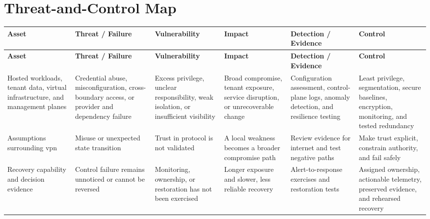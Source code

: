 \documentclass[11pt]{article}
\begin{document}
\section*{Threat-and-Control Map}
\begingroup\scriptsize\setlength{\tabcolsep}{2pt}
\begin{longtable}{>{\RaggedRight\arraybackslash}p{}>{\RaggedRight\arraybackslash}p{}>{\RaggedRight\arraybackslash}p{}>{\RaggedRight\arraybackslash}p{}>{\RaggedRight\arraybackslash}p{}>{\RaggedRight\arraybackslash}p{}}
\toprule\rowcolor{Navy}\color{white}\textbf{Asset} & \color{white}\textbf{Threat / Failure} & \color{white}\textbf{Vulnerability} & \color{white}\textbf{Impact} & \color{white}\textbf{Detection / Evidence} & \color{white}\textbf{Control}\\\midrule
\endfirsthead
\toprule\rowcolor{Navy}\color{white}\textbf{Asset} & \color{white}\textbf{Threat / Failure} & \color{white}\textbf{Vulnerability} & \color{white}\textbf{Impact} & \color{white}\textbf{Detection / Evidence} & \color{white}\textbf{Control}\\\midrule
\endhead
Hosted workloads, tenant data, virtual infrastructure, and management planes & Credential abuse, misconfiguration, cross-boundary access, or provider and dependency failure & Excess privilege, unclear responsibility, weak isolation, or insufficient visibility & Broad compromise, tenant exposure, service disruption, or unrecoverable change & Configuration assessment, control-plane logs, anomaly detection, and resilience testing & Least privilege, segmentation, secure baselines, encryption, monitoring, and tested redundancy\\\midrule
Assumptions surrounding vpn & Misuse or unexpected state transition & Trust in protocol is not validated & A local weakness becomes a broader compromise path & Review evidence for internet and test negative paths & Make trust explicit, constrain authority, and fail safely\\\midrule
Recovery capability and decision evidence & Control failure remains unnoticed or cannot be reversed & Monitoring, ownership, or restoration has not been exercised & Longer exposure and slower, less reliable recovery & Alert-to-response exercises and restoration tests & Assigned ownership, actionable telemetry, preserved evidence, and rehearsed recovery\\\midrule
\bottomrule
\end{longtable}
\endgroup
\end{document}
